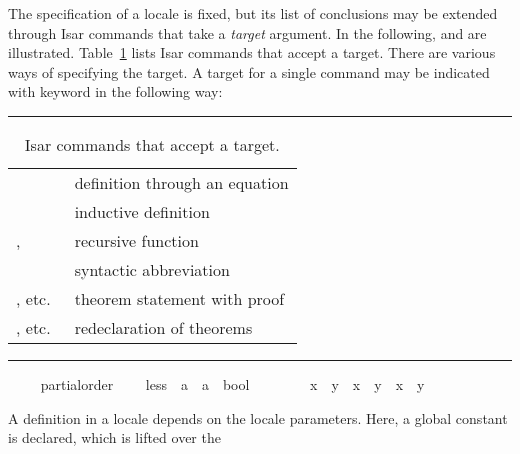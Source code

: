 \begin{isabellebody}
\begin{isamarkuptext}
  The specification of a locale is fixed, but its list of conclusions
  may be extended through Isar commands that take a \emph{target} argument.
  In the following,  and 
   are illustrated.
  Table~\ref{tab:commands-with-target} lists Isar commands that accept
  a target.  There are various ways of specifying the target.  A
  target for a single command may be indicated with keyword
   in the following way:

\begin{table}
\hrule
\vspace{2ex}
\begin{center}
\begin{tabular}{ll}
  \isakeyword{definition} & definition through an equation \\
  \isakeyword{inductive} & inductive definition \\
  \isakeyword{fun}, \isakeyword{function} & recursive function \\
  \isakeyword{abbreviation} & syntactic abbreviation \\
  \isakeyword{theorem}, etc.\ & theorem statement with proof \\
  \isakeyword{theorems}, etc.\ & redeclaration of theorems
\end{tabular}
\end{center}
\hrule
\caption{Isar commands that accept a target.}
\label{tab:commands-with-target}
\end{table}%
\end{isamarkuptext}%
\isamarkuptrue%
\ \ \isamarkupfalse%
\ {\isacharparenleft}\ partial{\isacharunderscore}order{\isacharparenright}\isanewline
\ \ \ \ less\ {\isacharcolon}{\isacharcolon}\ {\isachardoublequoteopen}{\isacharprime}a\ {\isasymRightarrow}\ {\isacharprime}a\ {\isasymRightarrow}\ bool{\isachardoublequoteclose}\ {\isacharparenleft}\ {\isachardoublequoteopen}{\isasymsqsubset}{\isachardoublequoteclose}\ {}{}{\isacharparenright}\isanewline
\ \ \ \ \ {\isachardoublequoteopen}{\isacharparenleft}x\ {\isasymsqsubset}\ y{\isacharparenright}\ {\isacharequal}\ {\isacharparenleft}x\ {\isasymsqsubseteq}\ y\ {\isasymand}\ x\ {\isasymnoteq}\ y{\isacharparenright}{\isachardoublequoteclose}%
\begin{isamarkuptext}%
A definition in a locale depends on the locale parameters.
  Here, a global constant  is declared, which is lifted over the

\end{isamarkuptext}
\end{isabellebody}
